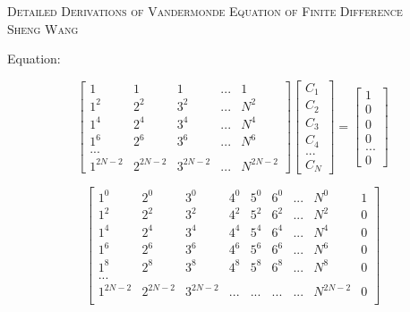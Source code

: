 \documentclass[a1paper]{article}
\begin{document}
\begin{center}
    \textsc{\LARGE Detailed Derivations of Vandermonde Equation of Finite Difference} \\
    \textsc{\Large Sheng Wang}
\end{center}


Equation:

\begin{equation}
    \begin{bmatrix}
        1        & 1        & 1        & ... & 1        \\
        1^2      & 2^2      & 3^2      & ... & N^2      \\
        1^4      & 2^4      & 3^4      & ... & N^4      \\
        1^6      & 2^6      & 3^6      & ... & N^6      \\
        ... \\
        1^{2N-2} & 2^{2N-2} & 3^{2N-2} & ... & N^{2N-2}
    \end{bmatrix}
    \begin{bmatrix}
        C_1 \\ C_2 \\ C_3 \\ C_4 \\ ... \\ C_N
    \end{bmatrix}
    =
    \begin{bmatrix}
        1 \\ 0 \\ 0 \\ 0 \\ ... \\ 0
    \end{bmatrix}
    \label{M_F}
\end{equation}

\begin{equation}
    \begin{bmatrix}
        1^0 & 2^0 & 3^0 & 4^0 & 5^0 & 6^0 & ... & N^0 & 1\\
        1^2 & 2^2 & 3^2 & 4^2 & 5^2 & 6^2 & ... & N^2 & 0\\
        1^4 & 2^4 & 3^4 & 4^4 & 5^4 & 6^4 & ... & N^4 & 0\\
        1^6 & 2^6 & 3^6 & 4^6 & 5^6 & 6^6 & ... & N^6 & 0\\
        1^8 & 2^8 & 3^8 & 4^8 & 5^8 & 6^8 & ... & N^8 & 0\\
        ... \\
        1^{2N-2} & 2^{2N-2} & 3^{2N-2} & ... & ...& ...& ... & N^{2N-2} & 0 \\
    \end{bmatrix}
\end{equation}
\end{document}
